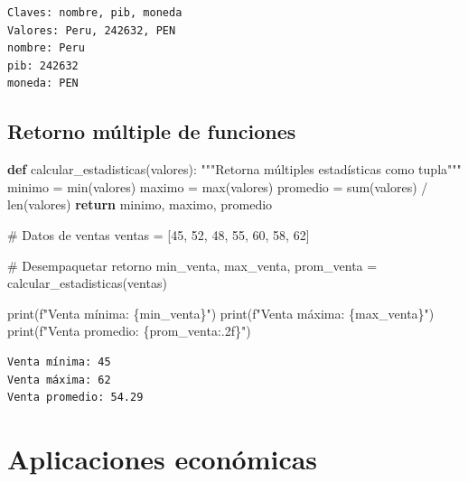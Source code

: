 \documentclass[
  doc,
  floatsintext,
  longtable,
  a4paper,
  nolmodern,
  notxfonts,
  notimes,
  12pt,
  colorlinks=true,linkcolor=blue,citecolor=blue,urlcolor=blue]{apa7}
\newenvironment{Shaded}{\begin{snugshade}}{\end{snugshade}}
\newcommand{\BuiltInTok}[1]{\textcolor[rgb]{0.00,0.23,0.31}{#1}}
\newcommand{\CommentTok}[1]{\textcolor[rgb]{0.37,0.37,0.37}{#1}}
\newcommand{\ControlFlowTok}[1]{\textcolor[rgb]{0.00,0.23,0.31}{\textbf{#1}}}
\newcommand{\DecValTok}[1]{\textcolor[rgb]{0.68,0.00,0.00}{#1}}
\newcommand{\KeywordTok}[1]{\textcolor[rgb]{0.00,0.23,0.31}{\textbf{#1}}}
\newcommand{\NormalTok}[1]{\textcolor[rgb]{0.00,0.23,0.31}{#1}}
\newcommand{\OperatorTok}[1]{\textcolor[rgb]{0.37,0.37,0.37}{#1}}
\newcommand{\SpecialCharTok}[1]{\textcolor[rgb]{0.37,0.37,0.37}{#1}}
\newcommand{\SpecialStringTok}[1]{\textcolor[rgb]{0.13,0.47,0.30}{#1}}
\begin{document}
\begin{verbatim}
Claves: nombre, pib, moneda
Valores: Peru, 242632, PEN
nombre: Peru
pib: 242632
moneda: PEN
\end{verbatim}

\subsection{Retorno múltiple de
funciones}\label{retorno-muxfaltiple-de-funciones}

\begin{Shaded}
\begin{Highlighting}[]
\KeywordTok{def}\NormalTok{ calcular\_estadisticas(valores):}
    \CommentTok{"""Retorna múltiples estadísticas como tupla"""}
\NormalTok{    minimo }\OperatorTok{=} \BuiltInTok{min}\NormalTok{(valores)}
\NormalTok{    maximo }\OperatorTok{=} \BuiltInTok{max}\NormalTok{(valores)}
\NormalTok{    promedio }\OperatorTok{=} \BuiltInTok{sum}\NormalTok{(valores) }\OperatorTok{/} \BuiltInTok{len}\NormalTok{(valores)}
    \ControlFlowTok{return}\NormalTok{ minimo, maximo, promedio}

\CommentTok{\# Datos de ventas}
\NormalTok{ventas }\OperatorTok{=}\NormalTok{ [}\DecValTok{45}\NormalTok{, }\DecValTok{52}\NormalTok{, }\DecValTok{48}\NormalTok{, }\DecValTok{55}\NormalTok{, }\DecValTok{60}\NormalTok{, }\DecValTok{58}\NormalTok{, }\DecValTok{62}\NormalTok{]}

\CommentTok{\# Desempaquetar retorno}
\NormalTok{min\_venta, max\_venta, prom\_venta }\OperatorTok{=}\NormalTok{ calcular\_estadisticas(ventas)}

\BuiltInTok{print}\NormalTok{(}\SpecialStringTok{f"Venta mínima: }\SpecialCharTok{\{}\NormalTok{min\_venta}\SpecialCharTok{\}}\SpecialStringTok{"}\NormalTok{)}
\BuiltInTok{print}\NormalTok{(}\SpecialStringTok{f"Venta máxima: }\SpecialCharTok{\{}\NormalTok{max\_venta}\SpecialCharTok{\}}\SpecialStringTok{"}\NormalTok{)}
\BuiltInTok{print}\NormalTok{(}\SpecialStringTok{f"Venta promedio: }\SpecialCharTok{\{}\NormalTok{prom\_venta}\SpecialCharTok{:.2f\}}\SpecialStringTok{"}\NormalTok{)}
\end{Highlighting}
\end{Shaded}

\begin{verbatim}
Venta mínima: 45
Venta máxima: 62
Venta promedio: 54.29
\end{verbatim}

\section{Aplicaciones económicas}\label{aplicaciones-econuxf3micas}
\end{document}
